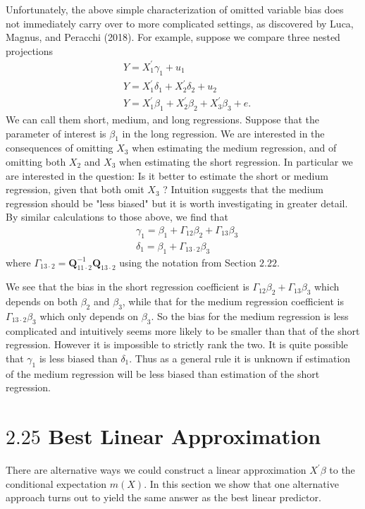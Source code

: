 \documentclass[10pt]{article}
\begin{document}
Unfortunately, the above simple characterization of omitted variable bias does not immediately carry over to more complicated settings, as discovered by Luca, Magnus, and Peracchi (2018). For example, suppose we compare three nested projections
$$
\begin{aligned}
&Y=X_{1}^{\prime} \gamma_{1}+u_{1} \\
&Y=X_{1}^{\prime} \delta_{1}+X_{2}^{\prime} \delta_{2}+u_{2} \\
&Y=X_{1}^{\prime} \beta_{1}+X_{2}^{\prime} \beta_{2}+X_{3}^{\prime} \beta_{3}+e .
\end{aligned}
$$
We can call them short, medium, and long regressions. Suppose that the parameter of interest is $\beta_{1}$ in the long regression. We are interested in the consequences of omitting $X_{3}$ when estimating the medium regression, and of omitting both $X_{2}$ and $X_{3}$ when estimating the short regression. In particular we are interested in the question: Is it better to estimate the short or medium regression, given that both omit $X_{3}$ ? Intuition suggests that the medium regression should be "less biased" but it is worth investigating in greater detail. By similar calculations to those above, we find that
$$
\begin{aligned}
&\gamma_{1}=\beta_{1}+\Gamma_{12} \beta_{2}+\Gamma_{13} \beta_{3} \\
&\delta_{1}=\beta_{1}+\Gamma_{13 \cdot 2} \beta_{3}
\end{aligned}
$$
where $\Gamma_{13 \cdot 2}=\boldsymbol{Q}_{11 \cdot 2}^{-1} \boldsymbol{Q}_{13 \cdot 2}$ using the notation from Section $2.22$.

We see that the bias in the short regression coefficient is $\Gamma_{12} \beta_{2}+\Gamma_{13} \beta_{3}$ which depends on both $\beta_{2}$ and $\beta_{3}$, while that for the medium regression coefficient is $\Gamma_{13 \cdot 2} \beta_{3}$ which only depends on $\beta_{3}$. So the bias for the medium regression is less complicated and intuitively seems more likely to be smaller than that of the short regression. However it is impossible to strictly rank the two. It is quite possible that $\gamma_{1}$ is less biased than $\delta_{1}$. Thus as a general rule it is unknown if estimation of the medium regression will be less biased than estimation of the short regression.

\section{$2.25$ Best Linear Approximation}
There are alternative ways we could construct a linear approximation $X^{\prime} \beta$ to the conditional expectation $m(X)$. In this section we show that one alternative approach turns out to yield the same answer as the best linear predictor.
\end{document}
